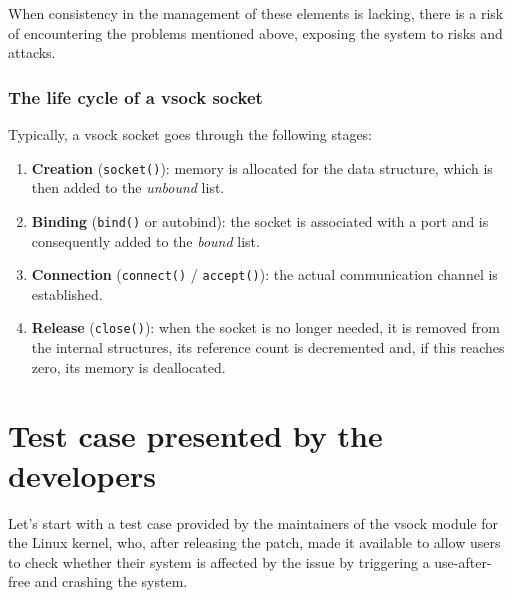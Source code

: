 When consistency in the management of these elements is lacking, there is a risk of encountering the problems mentioned above, exposing the system to risks and attacks.

\subsubsection{The life cycle of a vsock socket}
Typically, a vsock socket goes through the following stages:
\begin{enumerate}
    \item \textbf{Creation} (\texttt{socket()}): memory is allocated for the data structure, which is then added to the \textit{unbound} list.

    \item \textbf{Binding} (\texttt{bind()} or autobind): the socket is associated with a port and is consequently added to the \textit{bound} list.

    \item \textbf{Connection} (\texttt{connect()} / \texttt{accept()}): the actual communication channel is established.

    \item \textbf{Release} (\texttt{close()}): when the socket is no longer needed, it is removed from the internal structures, its reference count is decremented and, if this reaches zero, its memory is deallocated.
\end{enumerate}

\section{Test case presented by the developers}\label{sec:test-case}
Let's start with a test case \cite{bib:linux-test-case-suite} provided by the maintainers of the vsock module for the Linux kernel, who, after releasing the patch, made it available to allow users to check whether their system is affected by the issue by triggering a use-after-free and crashing the system.

